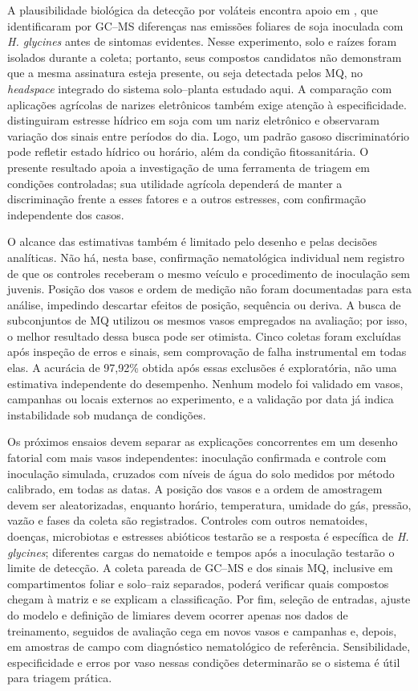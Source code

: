 A plausibilidade biológica da detecção por voláteis encontra apoio em
\cite{constantino2021}, que identificaram por GC--MS diferenças nas emissões
foliares de soja inoculada com \textit{H. glycines} antes de sintomas
evidentes. Nesse experimento, solo e raízes foram isolados durante a
coleta; portanto, seus compostos candidatos não demonstram que a mesma
assinatura esteja presente, ou seja detectada pelos MQ, no
\textit{headspace} integrado do sistema solo--planta estudado aqui. A
comparação com aplicações agrícolas de narizes eletrônicos também exige
atenção à especificidade. \cite{herrmann2024} distinguiram estresse hídrico
em soja com um nariz eletrônico e observaram variação dos sinais entre
períodos do dia. Logo, um padrão gasoso discriminatório pode refletir
estado hídrico ou horário, além da condição fitossanitária. O presente
resultado apoia a investigação de uma ferramenta de triagem em condições
controladas; sua utilidade agrícola dependerá de manter a discriminação
frente a esses fatores e a outros estresses, com confirmação independente
dos casos.

O alcance das estimativas também é limitado pelo desenho e pelas decisões
analíticas. Não há, nesta base, confirmação nematológica individual nem
registro de que os controles receberam o mesmo veículo e procedimento de
inoculação sem juvenis. Posição dos vasos e ordem de medição não foram
documentadas para esta análise, impedindo descartar efeitos de posição,
sequência ou deriva. A busca de subconjuntos de MQ utilizou os mesmos
vasos empregados na avaliação; por isso, o melhor resultado dessa busca
pode ser otimista. Cinco coletas foram excluídas após inspeção de erros e
sinais, sem comprovação de falha instrumental em todas elas. A acurácia
de 97,92\% obtida após essas exclusões é exploratória, não uma estimativa
independente do desempenho. Nenhum modelo foi validado em vasos, campanhas
ou locais externos ao experimento, e a validação por data já indica
instabilidade sob mudança de condições.

Os próximos ensaios devem separar as explicações concorrentes em um
desenho fatorial com mais vasos independentes: inoculação confirmada e
controle com inoculação simulada, cruzados com níveis de água do solo
medidos por método calibrado, em todas as datas. A posição dos vasos e a
ordem de amostragem devem ser aleatorizadas, enquanto horário, temperatura,
umidade do gás, pressão, vazão e fases da coleta são registrados. Controles
com outros nematoides, doenças, microbiotas e estresses abióticos testarão
se a resposta é específica de \textit{H. glycines}; diferentes cargas do
nematoide e tempos após a inoculação testarão o limite de detecção. A
coleta pareada de GC--MS e dos sinais MQ, inclusive em compartimentos
foliar e solo--raiz separados, poderá verificar quais compostos chegam à
matriz e se explicam a classificação. Por fim, seleção de entradas,
ajuste do modelo e definição de limiares devem ocorrer apenas nos dados
de treinamento, seguidos de avaliação cega em novos vasos e campanhas e,
depois, em amostras de campo com diagnóstico nematológico de referência.
Sensibilidade, especificidade e erros por vaso nessas condições determinarão
se o sistema é útil para triagem prática.
\endgroup
